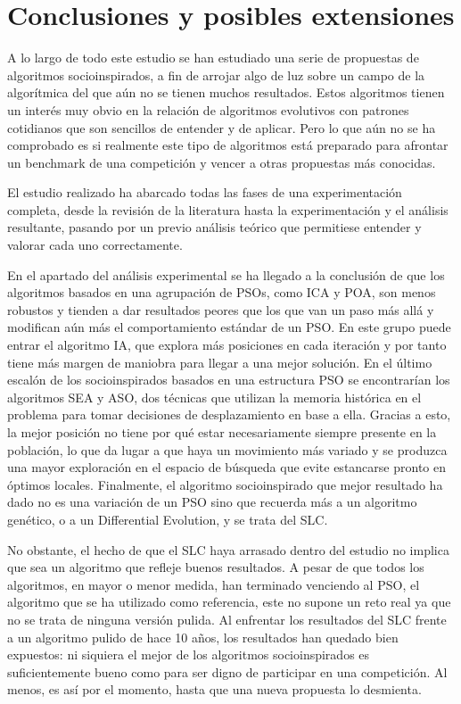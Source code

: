 \chapter{Conclusiones y posibles extensiones}

A lo largo de todo este estudio se han estudiado una serie de propuestas de algoritmos socioinspirados, a fin de arrojar algo de luz sobre un campo de la algorítmica del que aún no se tienen muchos resultados. Estos algoritmos tienen un interés muy obvio en la relación de algoritmos evolutivos con patrones cotidianos que son sencillos de entender y de aplicar. Pero lo que aún no se ha comprobado es si realmente este tipo de algoritmos está preparado para afrontar un benchmark de una competición y vencer a otras propuestas más conocidas.

El estudio realizado ha abarcado todas las fases de una experimentación completa, desde la revisión de la literatura hasta la experimentación y el análisis resultante, pasando por un previo análisis teórico que permitiese entender y valorar cada uno correctamente.

En el apartado del análisis experimental se ha llegado a la conclusión de que los algoritmos basados en una agrupación de PSOs, como ICA y POA, son menos robustos y tienden a dar resultados peores que los que van un paso más allá y modifican aún más el comportamiento estándar de un PSO. En este grupo puede entrar el algoritmo IA, que explora más posiciones en cada iteración y por tanto tiene más margen de maniobra para llegar a una mejor solución. En el último escalón de los socioinspirados basados en una estructura PSO se encontrarían los algoritmos SEA y ASO, dos técnicas que utilizan la memoria histórica en el problema para tomar decisiones de desplazamiento en base a ella. Gracias a esto, la mejor posición no tiene por qué estar necesariamente siempre presente en la población, lo que da lugar a que haya un movimiento más variado y se produzca una mayor exploración en el espacio de búsqueda que evite estancarse pronto en óptimos locales. Finalmente, el algoritmo socioinspirado que mejor resultado ha dado no es una variación de un PSO sino que recuerda más a un algoritmo genético, o a un Differential Evolution, y se trata del SLC.

No obstante, el hecho de que el SLC haya arrasado dentro del estudio no implica que sea un algoritmo que refleje buenos resultados. A pesar de que todos los algoritmos, en mayor o menor medida, han terminado venciendo al PSO, el algoritmo que se ha utilizado como referencia, este no supone un reto real ya que no se trata de ninguna versión pulida. Al enfrentar los resultados del SLC frente a un algoritmo pulido de hace 10 años, los resultados han quedado bien expuestos: ni siquiera el mejor de los algoritmos socioinspirados es suficientemente bueno como para ser digno de participar en una competición. Al menos, es así por el momento, hasta que una nueva propuesta lo desmienta.

